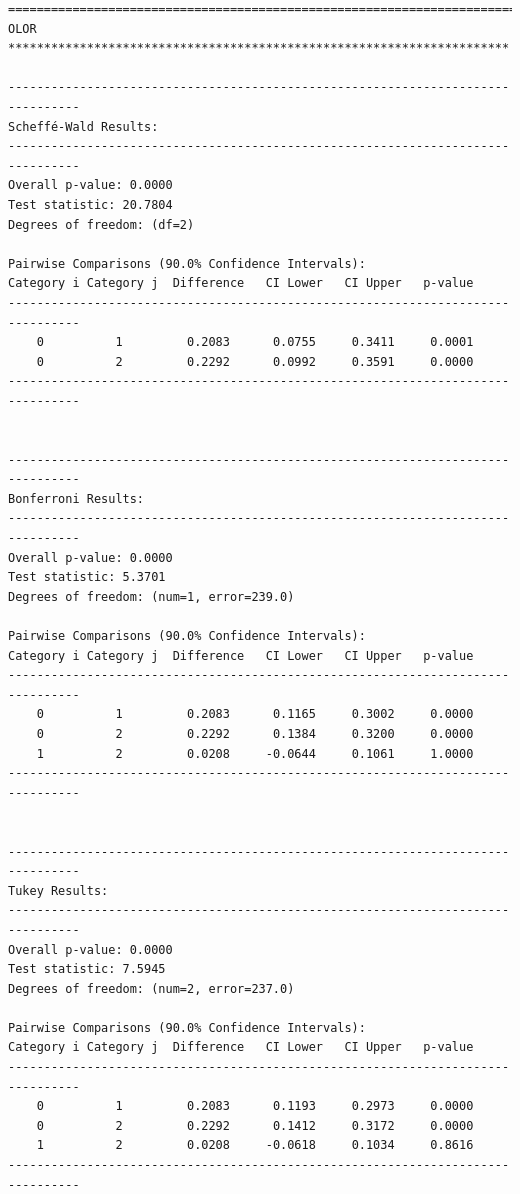 \begin{lstlisting}
================================================================================
OLOR **********************************************************************

--------------------------------------------------------------------------------
Scheffé-Wald Results:
--------------------------------------------------------------------------------
Overall p-value: 0.0000
Test statistic: 20.7804
Degrees of freedom: (df=2)

Pairwise Comparisons (90.0% Confidence Intervals):
Category i Category j  Difference   CI Lower   CI Upper   p-value  
--------------------------------------------------------------------------------
    0          1         0.2083      0.0755     0.3411     0.0001  
    0          2         0.2292      0.0992     0.3591     0.0000  
--------------------------------------------------------------------------------


--------------------------------------------------------------------------------
Bonferroni Results:
--------------------------------------------------------------------------------
Overall p-value: 0.0000
Test statistic: 5.3701
Degrees of freedom: (num=1, error=239.0)

Pairwise Comparisons (90.0% Confidence Intervals):
Category i Category j  Difference   CI Lower   CI Upper   p-value  
--------------------------------------------------------------------------------
    0          1         0.2083      0.1165     0.3002     0.0000  
    0          2         0.2292      0.1384     0.3200     0.0000  
    1          2         0.0208     -0.0644     0.1061     1.0000  
--------------------------------------------------------------------------------


--------------------------------------------------------------------------------
Tukey Results:
--------------------------------------------------------------------------------
Overall p-value: 0.0000
Test statistic: 7.5945
Degrees of freedom: (num=2, error=237.0)

Pairwise Comparisons (90.0% Confidence Intervals):
Category i Category j  Difference   CI Lower   CI Upper   p-value  
--------------------------------------------------------------------------------
    0          1         0.2083      0.1193     0.2973     0.0000  
    0          2         0.2292      0.1412     0.3172     0.0000  
    1          2         0.0208     -0.0618     0.1034     0.8616  
--------------------------------------------------------------------------------


\end{lstlisting}
